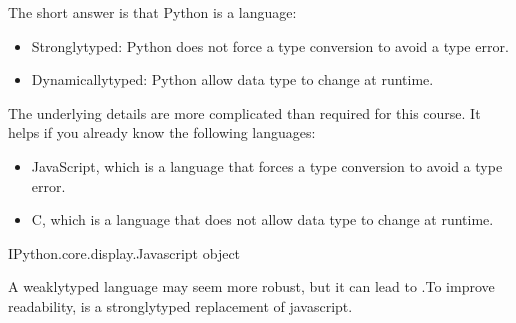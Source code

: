 \documentclass[letterpaper,10pt,english]{sphinxmanual}
\begin{document}

The short answer is that Python is a  language:
\begin{itemize}
\item {} 
Strongly\sphinxhyphen{}typed: Python does not force a type conversion to avoid a type error.

\item {} 
Dynamically\sphinxhyphen{}typed: Python allow data type to change at runtime.

\end{itemize}

The underlying details are more complicated than required for this course. It helps if you already know the following languages:
\begin{itemize}
\item {} 
JavaScript, which is a  language that forces a type conversion to avoid a type error.

\item {} 
C, which is a  language that does not allow data type to change at runtime.

\end{itemize}

\begin{sphinxVerbatim}[commandchars=\\\{\}]
      
\end{sphinxVerbatim}

\begin{sphinxVerbatim}[commandchars=\\\{\}]
\PYGZlt{}IPython.core.display.Javascript object\PYGZgt{}
\end{sphinxVerbatim}

A weakly\sphinxhyphen{}typed language may seem more robust, but it can lead to .To improve readability,  is a strongly\sphinxhyphen{}typed replacement of javascript.
\end{document}
